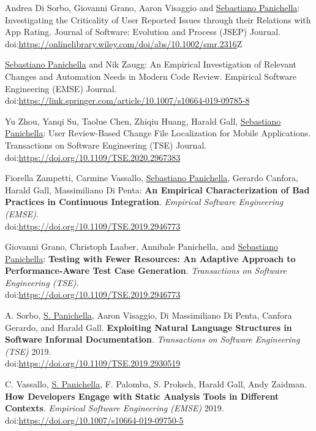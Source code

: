 \documentclass[10pt]{article}
\newcommand\doilink[1]{\href{http://dx.doi.org/#1}{#1}}
\newcommand\doi[1]{doi:\doilink{#1}}
\begin{document}
\begin{bibenum}
\item \label{J09}  Andrea Di Sorbo, Giovanni Grano, Aaron Visaggio and \underline{Sebastiano Panichella}:  Investigating the Criticality of User Reported Issues through their Relations with App Rating.   Journal of Software: Evolution and Process (JSEP) Journal. \\ \doi{https://onlinelibrary.wiley.com/doi/abs/10.1002/smr.2316}Z
\item \label{J08}  \underline{Sebastiano Panichella} and Nik Zaugg:  An Empirical Investigation of Relevant Changes and Automation Needs in Modern Code Review.   Empirical Software Engineering (EMSE) Journal. \\ \doi{https://link.springer.com/article/10.1007/s10664-019-09785-8} 
\item \label{J07} Yu Zhou, Yanqi Su, Taolue Chen, Zhiqiu Huang, Harald Gall, \underline{Sebastiano Panichella}:  User Review-Based Change File Localization for Mobile Applications.  Transactions on Software Engineering (TSE) Journal. \\ \doi{https://doi.org/10.1109/TSE.2020.2967383} 
\item \label{J06} Fiorella Zampetti, Carmine Vassallo, \underline{Sebastiano Panichella}, Gerardo Canfora, Harald Gall, Massimiliano Di Penta:  \textbf{An Empirical Characterization of Bad Practices in Continuous Integration}.  \emph{Empirical Software Engineering (EMSE)}. \\ \doi{https://doi.org/10.1109/TSE.2019.2946773}
\item \label{J05} Giovanni Grano, Christoph Laaber, Annibale Panichella, and \underline{Sebastiano Panichella}:  \textbf{Testing with Fewer Resources: An Adaptive Approach to Performance-Aware Test Case Generation}.  \emph{Transactions on Software Engineering (TSE)}.  \\ \doi{https://doi.org/10.1109/TSE.2019.2946773}\\
\item \label{J04} A. Sorbo, \underline{S. Panichella},  Aaron Visaggio, Di Massimiliano Di Penta, Canfora Gerardo, and Harald Gall. \textbf{Exploiting Natural Language Structures in Software Informal Documentation}. \emph{Transactions on Software Engineering (TSE)} 2019. \\ \doi{https://doi.org/10.1109/TSE.2019.2930519}\\
\item \label{J03} C. Vassallo, \underline{S. Panichella}, F. Palomba, S. Proksch, Harald Gall, Andy Zaidman. \textbf{How Developers Engage with Static Analysis Tools in Different Contexts}. \emph{Empirical Software Engineering (EMSE)} 2019.\\ \doi{https://doi.org/10.1007/s10664-019-09750-5}\\
    

\end{bibenum}
\end{document}
